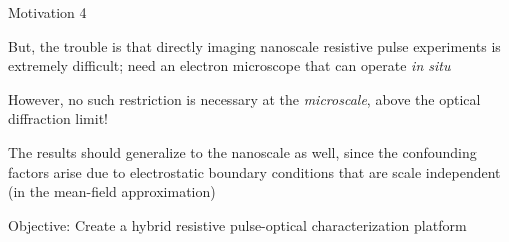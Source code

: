 

\begin{frame}[c]{Motivation 4}
	
	But, the trouble is that directly imaging nanoscale resistive pulse experiments is extremely difficult; need an electron microscope that can operate \textit{in situ}
	
	\vspace{.2in}
	
	However, no such restriction is necessary at the \textit{microscale}, above the optical diffraction limit!
	
	\vspace{.2in}
	
	The results should generalize to the nanoscale as well, since the confounding factors arise due to electrostatic boundary conditions that are scale independent (in the mean-field approximation)
	
	\vspace{.2in}
	
	\textcolor{negativered}{Objective: Create a hybrid resistive pulse-optical characterization platform}

\end{frame}




